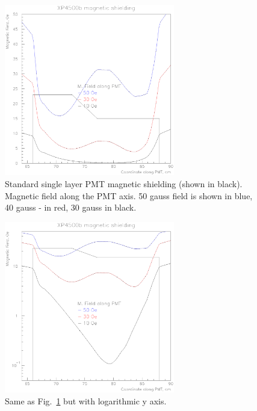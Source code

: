 \documentclass[11pt,titlepage]{article}
\begin{document}
 \begin{figure}
 \hspace{0.5cm}
 \begin{centering}
  \includegraphics[height=7.5cm]{shield_z_lin.eps}
 \vspace{0.5cm}
 \caption{\label{lin_z}
Standard single layer PMT magnetic shielding (shown in black).
Magnetic field along the PMT axis.
50 gauss field is shown in blue, 40 gauss - in red, 30 gauss in black.
}
\end{centering}
 \end{figure}
 \begin{figure}
 \hspace{0.5cm}
 \begin{centering}
  \includegraphics[height=7.5cm]{shield_z_log.eps}
 \vspace{0.5cm}
 \caption{\label{log_z}
Same as Fig.~\ref{lin_z} but with logarithmic y axis.}
\end{centering}
 \end{figure}
\end{document}

